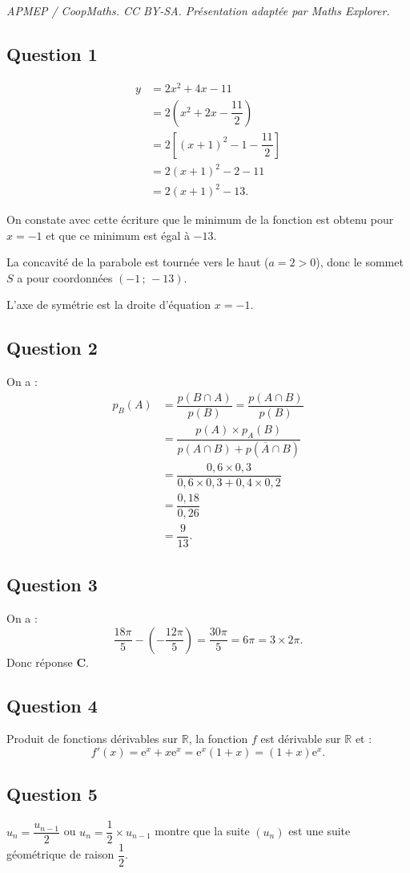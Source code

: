 \documentclass[10pt]{article}
\providecommand{\e}{{\mathrm{e}}}
\begin{document}
\noindent\textit{APMEP / CoopMaths. CC BY-SA. Présentation adaptée par Maths Explorer.}\par\medskip
\subsection*{Question 1}

\begin{align*}
y &= 2x^2 + 4x - 11 \\
&= 2 \left(x^2 + 2x - \dfrac{11}{2}\right) \\
&= 2\left[(x+1)^2 - 1 - \dfrac{11}{2}\right] \\
&= 2(x+1)^2 - 2 - 11 \\
&= 2(x+1)^2 - 13.
\end{align*}

On constate avec cette écriture que le minimum de la fonction est obtenu pour \(x = -1\) et que ce minimum est égal à \(-13\).

La concavité de la parabole est tournée vers le haut (\(a = 2 > 0\)), donc le sommet \(S\) a pour coordonnées \((-1 \,;\, -13)\).

L'axe de symétrie est la droite d'équation \(x = -1\).

\subsection*{Question 2}

On a :
\begin{align*}
p_B(A) &= \dfrac{p(B \cap A)}{p(B)} = \dfrac{p(A \cap B)}{p(B)} \\
&= \dfrac{p(A) \times p_A(B)}{p(A \cap B) + p(\overline{A} \cap B)} \\
&= \dfrac{0{,}6 \times 0{,}3}{0{,}6 \times 0{,}3 + 0{,}4 \times 0{,}2} \\
&= \dfrac{0{,}18}{0{,}26} \\
&= \dfrac{9}{13}.
\end{align*}

\subsection*{Question 3}

On a :
\[
\dfrac{18\pi}{5} - \left(-\dfrac{12\pi}{5}\right) = \dfrac{30\pi}{5} = 6\pi = 3 \times 2\pi.
\]
Donc réponse \(\textbf{C}\).

\subsection*{Question 4}

Produit de fonctions dérivables sur \(\mathbb{R}\), la fonction \(f\) est dérivable sur \(\mathbb{R}\) et :
\[
f'(x) = \e^x + x\e^x = \e^x (1 + x) = (1 + x)\e^x.
\]

\subsection*{Question 5}

\(u_n = \dfrac{u_{n-1}}{2}\) ou \(u_n = \dfrac{1}{2} \times u_{n-1}\) montre que la suite \((u_n)\) est une suite géométrique de raison \(\dfrac{1}{2}\).
\end{document}
